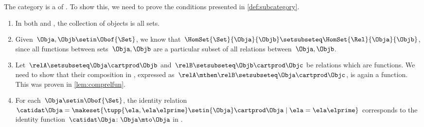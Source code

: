 {\begin{example}
    The category \Set is a  of \Rel.
    To show this, we need to prove the conditions presented in \cref{def:subcategory}.
    \begin{enumerate}
        \item In both \Rel and \Set, the collection of objects is all sets.
        \item Given~$\Obja,\Objb\setin \Obof{\Set}$, we know that~$\HomSet{\Set}{\Obja}{\Objb}\setsubseteq \HomSet{\Rel}{\Obja}{\Objb}$, since all functions between sets~$\Obja,\Objb$ are a particular subset of all relations between~$\Obja,\Objb$.
        \item Let~$\relA\setsubseteq \Obja\cartprod \Objb$ and~$\relB\setsubseteq \Objb \cartprod \Objc$ be relations which are functions.
              We need to show that their composition in \Rel, expressed as~$\relA\mthen \relB\setsubseteq \Obja\cartprod \Objc$, is again a function.
              This was proven in \cref{lem:comprelfun}.
        \item For each~$\Obja \setin \Obof{\Set}$, the identity relation~$\catidat\Obja=\makeset{\tupp{\ela,\ela\elprime}\setin {\Obja} \cartprod \Obja \mid \ela=\ela\elprime}$ corresponds to the identity function~$\catidat\Obja \colon \Obja \mto \Obja$ in \Set.
    \end{enumerate}
\end{example}

}
